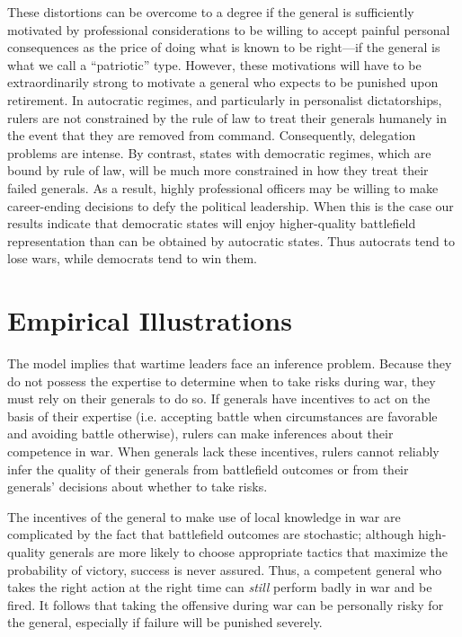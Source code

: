 \documentclass[11pt,]{article}
\begin{document}
These distortions can be overcome to a degree if the general is sufficiently motivated by professional considerations to be willing to accept painful personal consequences as the price of doing what is known to be right---if the general is what we call a ``patriotic'' type. However, these motivations will have to be extraordinarily strong to motivate a general who expects to be punished upon retirement. In autocratic regimes, and particularly in personalist dictatorships,  rulers are not constrained by the rule of law to treat their generals humanely in the event that they are removed from command. Consequently, delegation problems are intense. By contrast, states with democratic regimes, which are bound by rule of law, will be much more constrained in how they treat their failed generals. As a result, highly professional officers may be willing to make career-ending decisions to defy the political leadership. When this is the case our results indicate that democratic states will enjoy higher-quality battlefield representation than can be obtained by autocratic states.  Thus autocrats tend to lose wars, while democrats tend to win them.



\section{Empirical Illustrations}
The model implies that wartime leaders face an inference problem.  Because they do not possess the expertise to determine when to take risks during war, they must rely on their generals to do so.  If generals have incentives to act on the basis of their expertise (i.e. accepting battle when circumstances are favorable and avoiding battle otherwise), rulers can make inferences about their competence in war.  When generals lack these incentives, rulers cannot reliably infer the quality of their generals from battlefield outcomes or from their generals' decisions about whether to take risks.  



The incentives of the general to make use of local knowledge in war are complicated by the fact that battlefield outcomes are stochastic; although high-quality generals are more likely to choose appropriate tactics that maximize the probability of victory, success is never assured.  Thus, a competent general who takes the right action at the right time can \textit{still} perform badly in war and be fired.  It follows that taking the offensive during war can be personally risky for the general, especially if failure will be punished severely.
\end{document}
